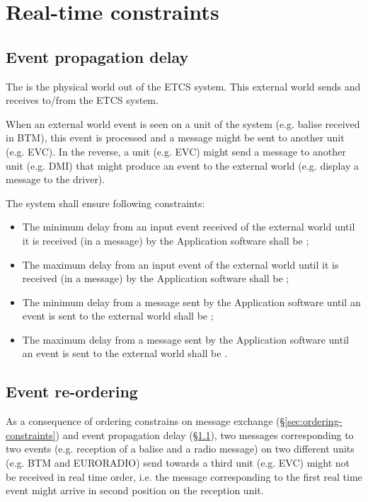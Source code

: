 \section{Real-time constraints}

\subsection{Event propagation delay}
\label{sec:event-propagation-delay}

The  is the physical world out of the ETCS
system. This external world sends and receives  to/from
the ETCS system.

When an external world event is seen on a unit of the system
(e.g. balise received in BTM), this event is processed and a message
might be sent to another unit (e.g. EVC). In the reverse, a unit
(e.g. EVC) might send a message to another unit (e.g. DMI) that might
produce an event to the external world (e.g. display a message to the
driver).

The system shall ensure following constraints:
\begin{itemize}
\item The minimum delay from an input event received of the external
  world until it is received (in a message) by the Application
  software shall be ;
\item The maximum delay from an input event of the external world
  until it is received (in a message) by the Application software
  shall be ;
\item The minimum delay from a message sent by the Application
  software until an event is sent to the external world shall be
  ;
\item The maximum delay from a message sent by the Application
  software until an event is sent to the external world shall be
  .
\end{itemize}

\subsection{Event re-ordering}

As a consequence of ordering constrains on message exchange
(§\ref{sec:ordering-constraints}) and event propagation delay
(§\ref{sec:event-propagation-delay}), two messages corresponding to
two events (e.g. reception of a balise and a radio message) on two
different units (e.g. BTM and EURORADIO) send towards a third unit
(e.g. EVC) might not be received in real time order, i.e. the message
corresponding to the first real time event might arrive in second
position on the reception unit.

